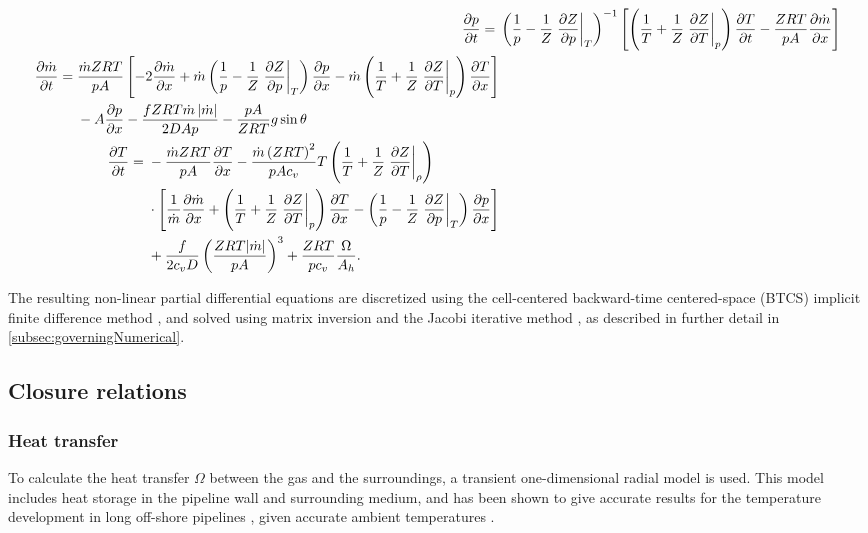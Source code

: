 {\allowdisplaybreaks %
\begin{align}
    \pdt{p} ={}& 
    \del{\frac{1}{p} - \frac{1}{Z} \eval{\dpd{Z}{p}}_T}^{-1}
    \sbr{
    \del{\frac{1}{T} + \frac{1}{Z}\eval{\dpd{Z}{T}}_p} \dpd{T}{t}
    - \frac{ZRT}{pA}\dpd{\dot m}{x}
    }
\label{eq:continuityEquation}
    \\
    \begin{split}
        \pdt{\dot m} ={}& \frac{\dot m ZRT}{pA} 
        \sbr{
            - 2\pdx{\dot m}
            + \dot m \del{\frac{1}{p} - \frac{1}{Z} \eval{\dpd{Z}{p}}_T} \pdx{p}
            - \dot m \del{\frac{1}{T} + \frac{1}{Z} \eval{\dpd{Z}{T}}_p} \pdx{T}
        }
        \\&
        {}- A\pdx{p}
        - \frac{fZRT \dot m \abs{\dot m}}{2DAp}
        - \frac{pA}{ZRT}g\sin\theta
    \end{split}
\label{eq:momentumEquation}
    \\
    \begin{split}
        \pdt{T} ={}&
        - \frac{\dot m ZRT}{pA}\pdx{T}
        - \frac{\dot m \del{ZRT}^2}{pAc_v}T \del{\frac{1}{T} + \frac{1}{Z}\eval{\dpd{Z}{T}}_\rho} \\
        &{}\times 
        \sbr{
            \frac{1}{\dot m}\dpd{\dot m}{x} 
            + \del{\frac{1}{T} + \frac{1}{Z}\eval{\dpd{Z}{T}}_p}\pdx{T}
            - \del{\frac{1}{p} - \frac{1}{Z}\eval{\dpd{Z}{p}}_T}\pdx{p}
        } \\
        &{}+ \frac{f}{2c_vD}\del{\frac{ZRT|\dot m|}{pA}}^3 
        + \frac{ZRT}{p c_v} \frac{\Omega}{A_h}
        .
    \end{split}
\label{eq:energyEquation}
\end{align}
}

The resulting non-linear partial differential equations are discretized using the cell-centered backward-time centered-space (BTCS) implicit finite difference method \cite{Kiuchi1993Implicit,Abbaspour2004Dynamic}, and solved using matrix inversion and the Jacobi iterative method \cite{Ferziger2002Computational}, as described in further detail in \cref{subsec:governingNumerical}.

\subsection{Closure relations}
\subsubsection{Heat transfer}
To calculate the heat transfer $\Omega$ between the gas and the surroundings, a transient one-dimensional radial model \cite{Chaczykowski2010Transient} is used. This model includes heat storage in the pipeline wall and surrounding medium, and has been shown to give accurate results for the temperature development in long off-shore pipelines \cite{Helgaker2014Validation,Oosterkamp2015Modelling,Oosterkamp2016Heat}, given accurate ambient temperatures \cite{Sund2015Pipeline}.

